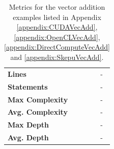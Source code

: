 \begin{table}[H]
    \begin{tabularx}{\textwidth}{ |X|X| }
      \hline
      \rowcolor{gray}
      \multicolumn{2}{|c|}{\textbf{SkePU Vector Addition}}\\ \hline
      \textbf{Lines}                    & - \\ \hline
      \textbf{Statements}               & - \\ \hline
      \textbf{Max Complexity}           & - \\ \hline
      \textbf{Avg. Complexity}          & - \\ \hline
      \textbf{Max Depth}                & - \\ \hline
      \textbf{Avg. Depth}               & - \\ \hline
    \end{tabularx}
    \caption{\label{tab:VecAddMetrics} Metrics for the vector addition examples listed in Appendix \ref{appendix:CUDAVecAdd}, \ref{appendix:OpenCLVecAdd}, \ref{appendix:DirectComputeVecAdd} and \ref{appendix:SkepuVecAdd}.}
\end{table}








